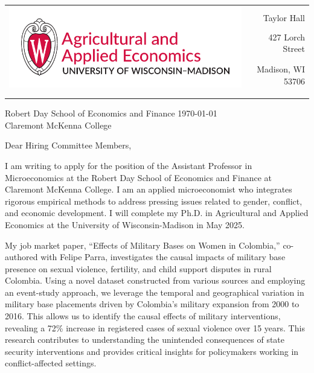 \documentclass[12pt]{letter}
\begin{document}
\begin{tabularx}{\textwidth}{Xr}
\multirow{4}{*}{\includegraphics[height=3\baselineskip]{logo_cropped.pdf}} &  \\
& Taylor Hall \\
& 427 Lorch Street \\
& Madison, WI 53706 \\
[-1.8ex]\\
\\
\end{tabularx}

Robert Day School of Economics and Finance \hfill \today \\
Claremont McKenna College

\medskip

Dear Hiring Committee Members,

I am writing to apply for the position of the Assistant Professor in Microeconomics
at the Robert Day School of Economics and Finance at Claremont McKenna College. 
I am an applied microeconomist who integrates rigorous empirical methods to address pressing issues related to gender, conflict, and economic development.
I will complete my Ph.D. in Agricultural and Applied Economics at the University of Wisconsin-Madison in May 2025. 

My job market paper, “Effects of Military Bases on Women in Colombia,” co-authored with Felipe Parra, investigates the causal impacts of military base presence 
on sexual violence, fertility, and child support disputes in rural Colombia. Using a novel dataset constructed from various sources and employing an event-study approach, 
we leverage the temporal and geographical variation in military base placements driven by Colombia's military expansion from 2000 to 2016. This allows us to identify 
the causal effects of military interventions, revealing a 72\% increase in registered cases of sexual violence over 15 years. 
This research contributes to understanding the unintended consequences of state security interventions and provides critical insights 
for policymakers working in conflict-affected settings.
\end{document}
